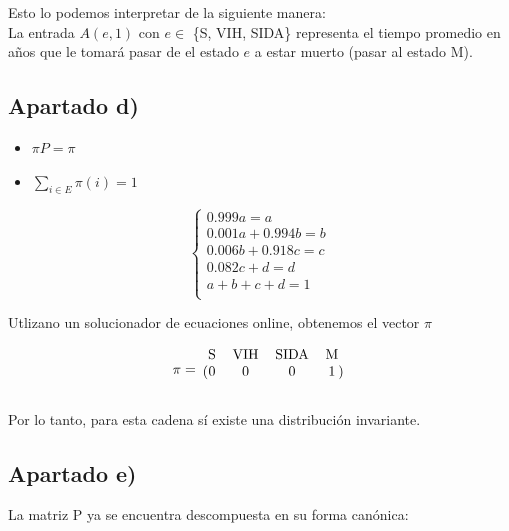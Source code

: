 \documentclass[11pt]{article}
\begin{document}
Esto lo podemos interpretar de la siguiente manera: \\
La entrada $A(e, 1)$ con $e \in$ \{S, VIH, SIDA\} representa el tiempo promedio en años
que le tomará pasar de el estado $e$ a estar muerto (pasar al estado M).


\newpage
\subsection*{Apartado d)}

\begin{itemize}
  \item $\pi P = \pi$
  \item $\displaystyle\sum_{i \in E} \pi(i) = 1$
\end{itemize}

\[
\begin{cases}
  0.999a = a \\
  0.001a + 0.994b=b \\
  0.006b+0.918c=c \\
  0.082c+d = d \\
  a+b+c+d=1 \\
\end{cases}
\]

Utlizano un solucionador de ecuaciones online, obtenemos el vector $\pi$

\begin{equation*}
  \pi = 
  \begin{blockarray}{cccc}
     \text{S} & \text{VIH} & \text{SIDA} & \text{M} \\
    \begin{block}{(cccc)}
      0 & 0 & 0 & 1 \\
    \end{block}
  \end{blockarray}
\end{equation*}

Por lo tanto, para esta cadena sí existe una distribución invariante.


\subsection*{Apartado e)}

La matriz P ya se encuentra descompuesta en su forma canónica:
\end{document}
